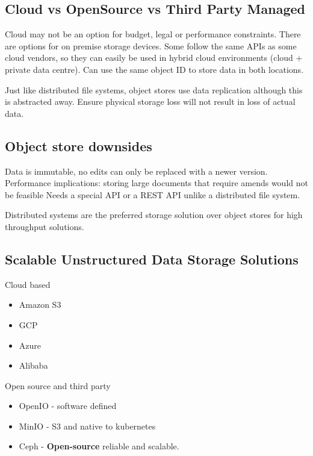 \subsection{Cloud vs OpenSource vs Third Party Managed}
Cloud may not be an option for budget, legal or performance constraints.
There are options for on premise storage devices.
Some follow the same APIs as some cloud vendors, so they can easily be used in hybrid cloud environments (cloud + private data centre).
Can use the same object ID to store data in both locations.

Just like distributed file systems, object stores use data replication although this is abstracted away.
Ensure physical storage loss will not result in loss of actual data.

\subsection{Object store downsides}
Data is immutable, no edits can only be replaced with a newer version.
Performance implications: storing large documents that require amends would not be feasible
Needs a special API or a REST API unlike a distributed file system.

Distributed systems are the preferred storage solution over object stores for high throughput solutions.

\subsection{Scalable Unstructured Data Storage Solutions}
Cloud based
\begin{itemize}%
    \item Amazon S3
    \item GCP
    \item Azure
    \item Alibaba
\end{itemize}

Open source and third party
\begin{itemize}
    \item OpenIO - software defined
    \item MinIO - S3 and native to kubernetes
    \item Ceph - \textbf{Open-source} reliable and scalable.
\end{itemize}
